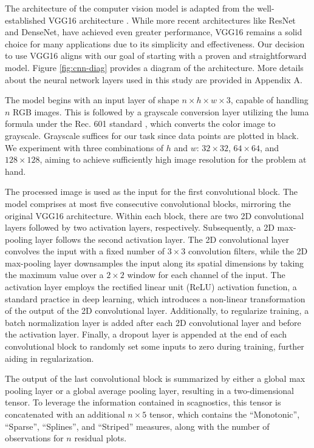 \documentclass[]{interact}
\theoremstyle{plain}%
\theoremstyle{definition}
\theoremstyle{remark}
\begin{document}
The architecture of the computer vision model is adapted from the
well-established VGG16 architecture \citep{simonyan2014very}. While more
recent architectures like ResNet \citep{he2016deep} and
DenseNet\citep{huang2017densely}, have achieved even greater
performance, VGG16 remains a solid choice for many applications due to
its simplicity and effectiveness. Our decision to use VGG16 aligns with
our goal of starting with a proven and straightforward model. Figure
\ref{fig:cnn-diag} provides a diagram of the architecture. More details
about the neural network layers used in this study are provided in
Appendix A.

The model begins with an input layer of shape
\(n \times h \times w \times 3\), capable of handling \(n\) RGB images.
This is followed by a grayscale conversion layer utilizing the luma
formula under the Rec. 601 standard \citep{series2011studio}, which
converts the color image to grayscale. Grayscale suffices for our task
since data points are plotted in black. We experiment with three
combinations of \(h\) and \(w\): \(32 \times 32\), \(64 \times 64\), and
\(128 \times 128\), aiming to achieve sufficiently high image resolution
for the problem at hand.

The processed image is used as the input for the first convolutional
block. The model comprises at most five consecutive convolutional
blocks, mirroring the original VGG16 architecture. Within each block,
there are two 2D convolutional layers followed by two activation layers,
respectively. Subsequently, a 2D max-pooling layer follows the second
activation layer. The 2D convolutional layer convolves the input with a
fixed number of \(3 \times 3\) convolution filters, while the 2D
max-pooling layer downsamples the input along its spatial dimensions by
taking the maximum value over a \(2 \times 2\) window for each channel
of the input. The activation layer employs the rectified linear unit
(ReLU) activation function, a standard practice in deep learning, which
introduces a non-linear transformation of the output of the 2D
convolutional layer. Additionally, to regularize training, a batch
normalization layer is added after each 2D convolutional layer and
before the activation layer. Finally, a dropout layer is appended at the
end of each convolutional block to randomly set some inputs to zero
during training, further aiding in regularization.

The output of the last convolutional block is summarized by either a
global max pooling layer or a global average pooling layer, resulting in
a two-dimensional tensor. To leverage the information contained in
scagnostics, this tensor is concatenated with an additional
\(n \times 5\) tensor, which contains the ``Monotonic'', ``Sparse'',
``Splines'', and ``Striped'' measures, along with the number of
observations for \(n\) residual plots.
\end{document}
